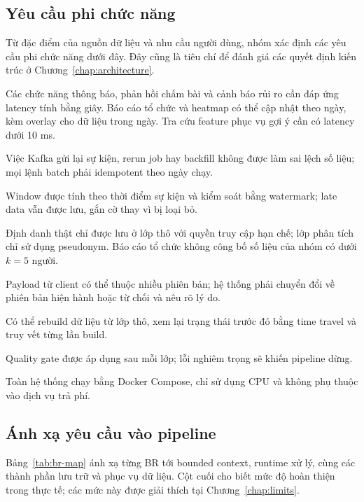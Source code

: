 \subsection{Yêu cầu phi chức năng}

Từ đặc điểm của nguồn dữ liệu và nhu cầu người dùng, nhóm xác định các yêu cầu phi chức năng dưới đây. Đây cũng là tiêu chí để đánh giá các quyết định kiến trúc ở Chương~\ref{chap:architecture}.

\begin{description}[style=nextline, leftmargin=0.6cm]
  \item[Latency phù hợp từng BR] Các chức năng thông báo, phản hồi chấm bài và cảnh báo rủi ro cần đáp ứng latency tính bằng giây. Báo cáo tổ chức và heatmap có thể cập nhật theo ngày, kèm overlay cho dữ liệu trong ngày. Tra cứu feature phục vụ gợi ý cần có latency dưới 10 ms.
  \item[Exactly-once, idempotent] Việc Kafka gửi lại sự kiện, rerun job hay backfill không được làm sai lệch số liệu; mọi lệnh batch phải idempotent theo ngày chạy.
  \item[Xử lý theo event time] Window được tính theo thời điểm sự kiện và kiểm soát bằng watermark; late data vẫn được lưu, gắn cờ thay vì bị loại bỏ.
  \item[Quyền riêng tư] Định danh thật chỉ được lưu ở lớp thô với quyền truy cập hạn chế; lớp phân tích chỉ sử dụng pseudonym. Báo cáo tổ chức không công bố số liệu của nhóm có dưới $k = 5$ người.
  \item[Schema evolution] Payload từ client có thể thuộc nhiều phiên bản; hệ thống phải chuyển đổi về phiên bản hiện hành hoặc từ chối và nêu rõ lý do.
  \item[Tái lập và kiểm toán] Có thể rebuild dữ liệu từ lớp thô, xem lại trạng thái trước đó bằng time travel và truy vết từng lần build.
  \item[Chất lượng dữ liệu] Quality gate được áp dụng sau mỗi lớp; lỗi nghiêm trọng sẽ khiến pipeline dừng.
  \item[Chạy được trên máy cá nhân] Toàn hệ thống chạy bằng Docker Compose, chỉ sử dụng CPU và không phụ thuộc vào dịch vụ trả phí.
\end{description}

\subsection{Ánh xạ yêu cầu vào pipeline}

Bảng~\ref{tab:br-map} ánh xạ từng BR tới bounded context, runtime xử lý, cùng các thành phần lưu trữ và phục vụ dữ liệu. Cột cuối cho biết mức độ hoàn thiện trong thực tế; các mức này được giải thích tại Chương~\ref{chap:limits}.

